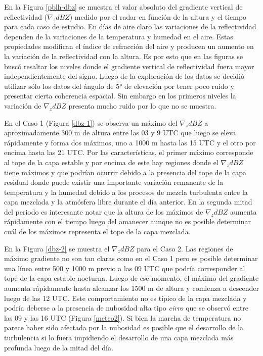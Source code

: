 \documentclass[12pt,spanish,oneside, a4paper]{book}
\begin{document}
En la Figura \ref{pblh-dbz} se muestra el valor absoluto del gradiente
vertical de reflectividad (\(\nabla_z dBZ\)) medido por el radar en
función de la altura y el tiempo para cada caso de estudio. En días de
aire claro las variaciones de la reflectividad dependen de la
variaciones de la temperatura y humedad en el aire. Estas propiedades
modifican el índice de refracción del aire y producen un aumento en la
variación de la reflectividad con la altura. Es por esto que en las
figuras se buscó resaltar los niveles donde el gradiente vertical de
reflectividad fuera mayor independientemente del signo. Luego de la
exploración de los datos se decidió utilizar sólo los datos del ángulo
de 5° de elevación por tener poco ruido y presentar cierta coherencia
espacial. Sin embargo en los primeros niveles la variación de
\(\nabla_z dBZ\) presenta mucho ruido por lo que no se muestra.

En el Caso 1 (Figura \ref{dbz-1}) se observa un máximo del
\(\nabla_z dBZ\) a aproximadamente 300 m de altura entre las 03 y 9 UTC
que luego se eleva rápidamente y forma dos máximos, uno a 1000 m hasta
las 15 UTC y el otro por encima hasta las 21 UTC. Por las
características, el primer máximo corresponde al tope de la capa estable
y por encima de este hay regiones donde el \(\nabla_z dBZ\) tiene
máximos y que podrían ocurrir debido a la presencia del tope de la capa
residual donde puede existir una importante variación remanente de la
temperatura y la humedad debido a los procesos de mezcla turbulenta
entre la capa mezclada y la atmósfera libre durante el día anterior. En
la segunda mitad del periodo es interesante notar que la altura de los
máximos de \(\nabla_z dBZ\) aumenta rápidamente con el tiempo luego del
amanecer aunque no es posible determinar cuál de los máximos representa
el tope de la capa mezclada.

En la Figura \ref{dbz-2} se muestra el \(\nabla_z dBZ\) para el Caso 2.
Las regiones de máximo gradiente no son tan claras como en el Caso 1
pero es posible determinar una línea entre 500 y 1000 m previo a las 09
UTC que podría corresponder al tope de la capa estable nocturna. Luego
de ese momento, el máximo del gradiente aumenta rápidamente hasta
alcanzar los 1500 m de altura y comienza a descender luego de las 12
UTC. Este comportamiento no es típico de la capa mezclada y podría
deberse a la presencia de nubosidad alta tipo \emph{cirro} que se
observó entre las 09 y las 16 UTC (Figura \ref{meteo2}). Si bien la
marcha de temperatura no parece haber sido afectada por la nubosidad es
posible que el desarrollo de la turbulencia si lo fuera impidiendo el
desarrollo de una capa mezclada más profunda luego de la mitad del día.
\end{document}
